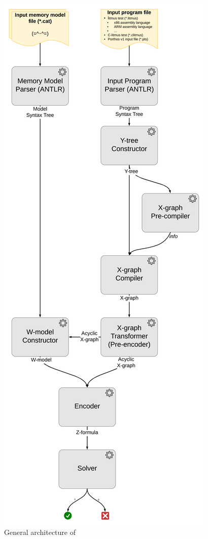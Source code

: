 \begin{figure}[H]
  \centering
  \includegraphics[width=\textwidth,height=0.8\textheight,keepaspectratio]{img/my/lucidchart.com/data-flow-vert-300dpi.png}
  \caption{General architecture of \porthos[2]}
  \label{fig:arch}
\end{figure}


